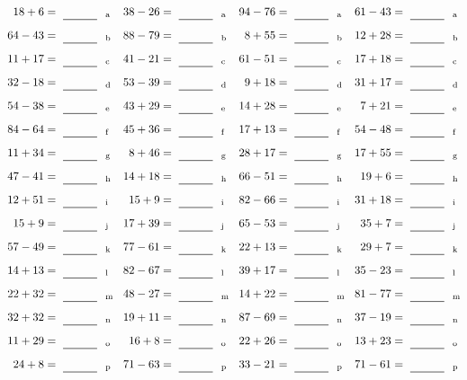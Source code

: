 \documentclass
[
  draft    = true,
  fontsize = 11pt,
  parskip  = half-
]
{scrartcl}
\begin{document}
\clearpage
\begin{align*}
    \pline{18+6}&=\rline{a}
  & \pline{38-26}&=\rline{a}
  & \pline{94-76}&=\rline{a}
  & \pline{61-43}&=\rline{a} \\[1ex]
    \pline{64-43}&=\rline{b}
  & \pline{88-79}&=\rline{b}
  & \pline{8+55}&=\rline{b}
  & \pline{12+28}&=\rline{b} \\[1ex]
    \pline{11+17}&=\rline{c}
  & \pline{41-21}&=\rline{c}
  & \pline{61-51}&=\rline{c}
  & \pline{17+18}&=\rline{c} \\[1ex]
    \pline{32-18}&=\rline{d}
  & \pline{53-39}&=\rline{d}
  & \pline{9+18}&=\rline{d}
  & \pline{31+17}&=\rline{d} \\[1ex]
    \pline{54-38}&=\rline{e}
  & \pline{43+29}&=\rline{e}
  & \pline{14+28}&=\rline{e}
  & \pline{7+21}&=\rline{e} \\[1ex]
    \pline{84-64}&=\rline{f}
  & \pline{45+36}&=\rline{f}
  & \pline{17+13}&=\rline{f}
  & \pline{54-48}&=\rline{f} \\[1ex]
    \pline{11+34}&=\rline{g}
  & \pline{8+46}&=\rline{g}
  & \pline{28+17}&=\rline{g}
  & \pline{17+55}&=\rline{g} \\[1ex]
    \pline{47-41}&=\rline{h}
  & \pline{14+18}&=\rline{h}
  & \pline{66-51}&=\rline{h}
  & \pline{19+6}&=\rline{h} \\[1ex]
    \pline{12+51}&=\rline{i}
  & \pline{15+9}&=\rline{i}
  & \pline{82-66}&=\rline{i}
  & \pline{31+18}&=\rline{i} \\[1ex]
    \pline{15+9}&=\rline{j}
  & \pline{17+39}&=\rline{j}
  & \pline{65-53}&=\rline{j}
  & \pline{35+7}&=\rline{j} \\[1ex]
    \pline{57-49}&=\rline{k}
  & \pline{77-61}&=\rline{k}
  & \pline{22+13}&=\rline{k}
  & \pline{29+7}&=\rline{k} \\[1ex]
    \pline{14+13}&=\rline{l}
  & \pline{82-67}&=\rline{l}
  & \pline{39+17}&=\rline{l}
  & \pline{35-23}&=\rline{l} \\[1ex]
    \pline{22+32}&=\rline{m}
  & \pline{48-27}&=\rline{m}
  & \pline{14+22}&=\rline{m}
  & \pline{81-77}&=\rline{m} \\[1ex]
    \pline{32+32}&=\rline{n}
  & \pline{19+11}&=\rline{n}
  & \pline{87-69}&=\rline{n}
  & \pline{37-19}&=\rline{n} \\[1ex]
    \pline{11+29}&=\rline{o}
  & \pline{16+8}&=\rline{o}
  & \pline{22+26}&=\rline{o}
  & \pline{13+23}&=\rline{o} \\[1ex]
    \pline{24+8}&=\rline{p}
  & \pline{71-63}&=\rline{p}
  & \pline{33-21}&=\rline{p}
  & \pline{71-61}&=\rline{p}
\end{align*}
\end{document}
